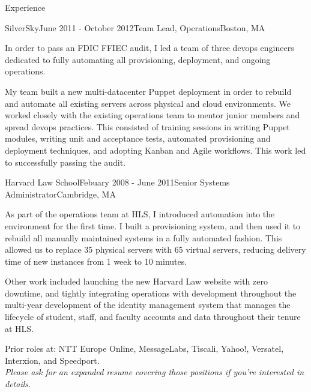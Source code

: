 \documentclass{resume} %
\begin{document}
\begin{rSection}{Experience}
\begin{rSubsection}{SilverSky}{June 2011 - October 2012}{Team Lead, Operations}{Boston, MA}
\item[] In order to pass an FDIC FFIEC audit, I led a team of three devops engineers dedicated to fully automating all provisioning, deployment, and ongoing operations.

My team built a new multi-datacenter Puppet deployment in order to rebuild and automate all existing servers across physical and cloud environments.  We worked closely with the existing operations team to mentor junior members and spread devops practices.  This consisted of training sessions in writing Puppet modules, writing unit and acceptance tests, automated provisioning and deployment techniques, and adopting Kanban and Agile workflows.  This work led to successfully passing the audit.
\end{rSubsection}

\begin{rSubsection}{Harvard Law School}{Febuary 2008 - June 2011}{Senior Systems Administrator}{Cambridge, MA}
\item[] As part of the operations team at HLS, I introduced automation into the environment for the first time.  I built a provisioning system, and then used it to rebuild all manually maintained systems in a fully automated fashion.  This allowed us to replace 35 physical servers with 65 virtual servers, reducing delivery time of new instances from 1 week to 10 minutes.

Other work included launching the new Harvard Law website with zero downtime, and tightly integrating operations with development throughout the multi-year development of the identity management system that manages the lifecycle of student, staff, and faculty accounts and data throughout their tenure at HLS.
\end{rSubsection}

\begin{center}
Prior roles at: NTT Europe Online, MessageLabs, Tiscali, Yahoo!, Versatel, Interxion, and Speedport.\\
\textit{Please ask for an expanded resume covering those positions if you're interested in details.}
\end{center}

\end{rSection}
\end{document}
